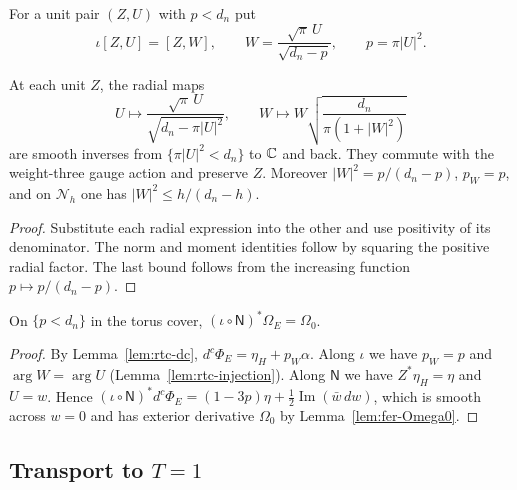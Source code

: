 \begin{construction}\label{cons:rtc-injection}
For a unit pair $(Z,U)$ with $p<d_n$ put
\[
 \iota[Z,U]=[Z,W],\qquad W=\frac{\sqrt\pi\,U}{\sqrt{d_n-p}},\qquad p=\pi|U|^2 .
\]
\end{construction}

\begin{lemma}\label{lem:rtc-injection}
At each unit $Z$, the radial maps
\[
 U\mapsto\frac{\sqrt\pi\,U}{\sqrt{d_n-\pi|U|^2}},\qquad
 W\mapsto W\sqrt{\frac{d_n}{\pi(1+|W|^2)}}
\]
are smooth inverses from $\{\pi|U|^2<d_n\}$ to $\mathbb{C}$ and back.
They commute with the weight-three gauge action and preserve $Z$.
Moreover $|W|^2=p/(d_n-p)$, $p_W=p$, and on $\mathcal N_h$ one has $|W|^2\le h/(d_n-h)$.
\end{lemma}

\begin{proof}
Substitute each radial expression into the other and use positivity of its denominator.
The norm and moment identities follow by squaring the positive radial factor.
The last bound follows from the increasing function $p\mapsto p/(d_n-p)$.
\end{proof}

\begin{proposition}\label{prop:rtc-central}
On $\{p<d_n\}$ in the torus cover,
$(\iota\circ\mathsf N)^*\Omega_E=\Omega_0$.
\end{proposition}

\begin{proof}
By Lemma~\ref{lem:rtc-dc}, $d^c\Phi_E=\eta_H+p_W\alpha$. Along $\iota$ we have $p_W=p$ and $\arg W=\arg U$ (Lemma~\ref{lem:rtc-injection}). Along $\mathsf N$ we have $Z^*\eta_H=\eta$ and $U=w$. Hence $(\iota\circ\mathsf N)^*d^c\Phi_E=(1-3p)\eta+\frac12\operatorname{Im}(\bar w\,dw)$, which is smooth across $w=0$ and has exterior derivative $\Omega_0$ by Lemma~\ref{lem:fer-Omega0}.
\end{proof}

\subsection{Transport to $T=1$}\label{sec:rtc-transport}

